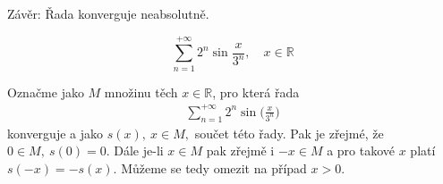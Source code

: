 \documentclass[answers]{exam}
\begin{document}
\begin{questions}
\begin{solution}
		
		Závěr: Řada konverguje neabsolutně.
  \end{solution}

  \question
  \begin{equation*}
    \sum_{n = 1}^{+\infty}
    2^n \sin \frac{x}{3^n},
    \quad
    x \in \mathbb{R}
  \end{equation*}
  
  \begin{solution}  
		Ozna\v cme jako $M$ mno\v zinu t\v ech $x\in\mathbb R$, pro kter\'a \v rada
		\begin{align}\label{rada 1}
		\sum_{n=1}^{+\infty}2^n\sin\big(\frac{x}{3^n}\big)
		\end{align}
		konverguje a jako $s(x),\ x\in M,$ sou\v cet t\'eto \v rady. Pak je z\v rejm\'e, \v ze $0\in M,\ s(0)=0$. D\'ale je-li $x\in M$ pak z\v rejm\v e i $-x\in M$ a pro takov\'e $x$ plat\'i $s(-x)=-s(x)$. M\r u\v zeme se tedy omezit na p\v r\'ipad $x>0$. 
		

\end{solution}
\end{questions}
\end{document}
